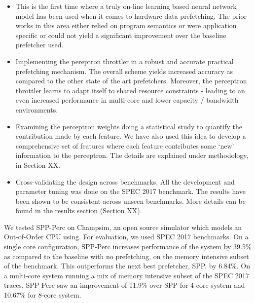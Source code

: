 \documentclass{sig-alternate}
\begin{document}
\begin{itemize}
\item This is the first time where a truly on-line learning based neural network model has been used when it comes to hardware data prefetching. 
The prior works in this area either relied on program semantics\cite{Semantics} or were application specific\cite{Datacenter} or could not yield a significant improvement over the baseline prefetcher used\cite{BadPerc}.

\item Implementing the pereptron throttler in a robust and accurate practical prefetching mechanism. 
The overall scheme yields increased accuracy as compared to the other state of the art prefetchers.
Moreover, the perceptron throttler learns to adapt itself to shared resource constraints - leading to an even increased performance in multi-core and lower capacity / bandwidth environments. 

\item Examining the perceptron weights doing a statistical study to quantify the contribution made by each feature.
We have also used this idea to develop a comprehensive set of features where each feature contributes some `new' information to the perceptron.
The details are explained under methodology, in Section XX.

\item Cross-validating the design across benchmarks. 
All the development and parameter tuning was done on the SPEC 2017 benchmark. 
The results have been shown to be consistent across unseen benchmarks.
More details can be found in the results section (Section XX).



\end{itemize}

We tested SPP-Perc on Champsim, an open source simulator which models an Out-of-Order CPU using. 
For evaluation, we used SPEC 2017 benchmarks. 
On a single core configuration, SPP-Perc increases performance of the system by 39.5\% as compared to the baseline with no prefetching, on the memory intensive subset of the benchmark.
This outperforms the next best prefetcher, SPP,  by 6.84\%. 
On a multi-core system running a mix of memory intensive subset of the SPEC 2017 traces, SPP-Perc saw an improvement of 11.9\% over SPP for 4-core system and 10.67\% for 8-core system.
\end{document}
